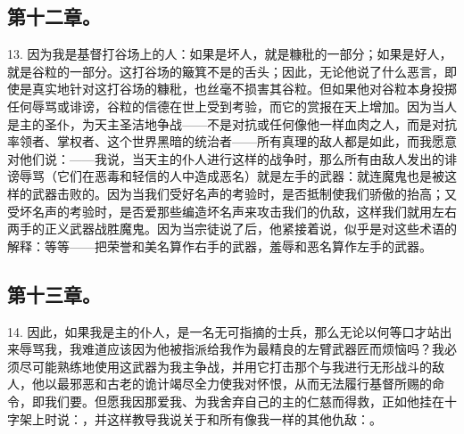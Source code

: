 
\subsection{第十二章。}

13. 因为我是基督打谷场上的人：如果是坏人，就是糠秕的一部分；如果是好人，就是谷粒的一部分。这打谷场的簸箕不是的舌头；因此，无论他说了什么恶言，即使是真实地针对这打谷场的糠秕，也丝毫不损害其谷粒。但如果他对谷粒本身投掷任何辱骂或诽谤，谷粒的信德在世上受到考验，而它的赏报在天上增加。因为当人是主的圣仆，为天主圣洁地争战——不是对抗或任何像他一样血肉之人，而是对抗率领者、掌权者、这个世界黑暗的统治者——所有真理的敌人都是如此，而我愿意对他们说：——我说，当天主的仆人进行这样的战争时，那么所有由敌人发出的诽谤辱骂（它们在恶毒和轻信的人中造成恶名）就是左手的武器：就连魔鬼也是被这样的武器击败的。因为当我们受好名声的考验时，是否抵制使我们骄傲的抬高；又受坏名声的考验时，是否爱那些编造坏名声来攻击我们的仇敌，这样我们就用左右两手的正义武器战胜魔鬼。因为当宗徒说了后，他紧接着说，似乎是对这些术语的解释：等等——把荣誉和美名算作右手的武器，羞辱和恶名算作左手的武器。\par


\subsection{第十三章。}

14. 因此，如果我是主的仆人，是一名无可指摘的士兵，那么无论以何等口才站出来辱骂我，我难道应该因为他被指派给我作为最精良的左臂武器匠而烦恼吗？我必须尽可能熟练地使用这武器为我主争战，并用它打击那个与我进行无形战斗的敌人，他以最邪恶和古老的诡计竭尽全力使我对怀恨，从而无法履行基督所赐的命令，即我们要。但愿我因那爱我、为我舍弃自己的主的仁慈而得救，正如他挂在十字架上时说：，并这样教导我说关于和所有像我一样的其他仇敌：。\par



